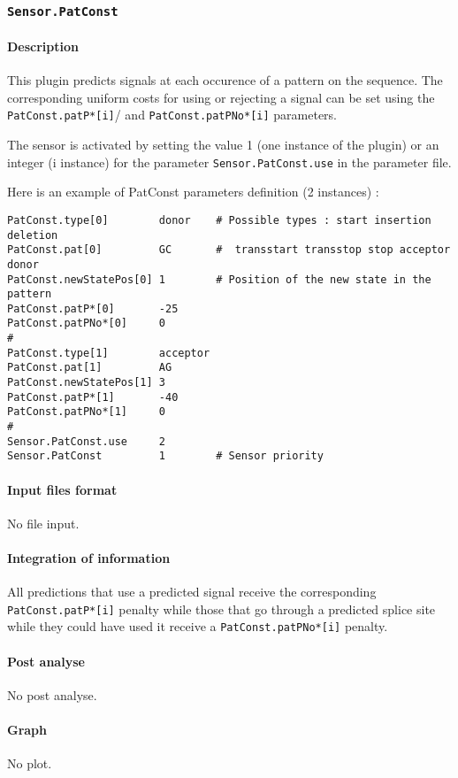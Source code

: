 
\subsubsection{\texttt{Sensor.PatConst}}

\paragraph{Description}

This plugin predicts signals at each occurence of a pattern on the
sequence. The corresponding uniform costs for using
or rejecting a signal can be set using the
\texttt{PatConst.patP*[i]}/ and \texttt{PatConst.patPNo*[i]} parameters.

The sensor is activated by setting the value 1 (one instance of the
plugin) or an integer (i instance) for the parameter
\texttt{Sensor.PatConst.use} in the parameter file.

Here is an example of PatConst parameters definition (2 instances) :
\begin{Verbatim}[fontsize=\small]
PatConst.type[0]        donor    # Possible types : start insertion deletion
PatConst.pat[0]         GC       #  transstart transstop stop acceptor donor
PatConst.newStatePos[0] 1        # Position of the new state in the pattern
PatConst.patP*[0]       -25
PatConst.patPNo*[0]     0
#
PatConst.type[1]        acceptor
PatConst.pat[1]         AG   
PatConst.newStatePos[1] 3
PatConst.patP*[1]       -40
PatConst.patPNo*[1]     0
#
Sensor.PatConst.use     2
Sensor.PatConst         1        # Sensor priority
\end{Verbatim}

\paragraph{Input files format}

No file input.

\paragraph{Integration of information}

All predictions that use a predicted signal receive the
corresponding \texttt{PatConst\-.patP*[i]} penalty while those that go through
a predicted splice site while they could have used it receive a
\texttt{PatConst.patPNo*[i]} penalty.

\paragraph{Post analyse}

No post analyse.

\paragraph{Graph}

No plot.
